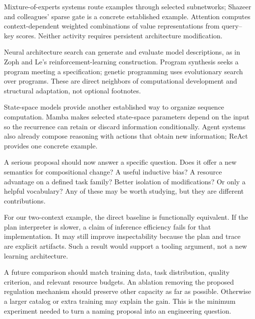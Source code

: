 Mixture-of-experts systems route examples through selected subnetworks; Shazeer and colleagues' sparse gate is a concrete established example.\cite{moe} Attention computes context-dependent weighted combinations of value representations from query--key scores.\cite{attention} Neither activity requires persistent architecture modification.

Neural architecture search can generate and evaluate model descriptions, as in Zoph and Le's reinforcement-learning construction.\cite{nas} Program synthesis seeks a program meeting a specification;\cite{synthesis} genetic programming uses evolutionary search over programs.\cite{gp} These are direct neighbors of computational development and structural adaptation, not optional footnotes.

State-space models provide another established way to organize sequence computation. Mamba makes selected state-space parameters depend on the input so the recurrence can retain or discard information conditionally.\cite{mamba} Agent systems also already compose reasoning with actions that obtain new information; ReAct provides one concrete example.\cite{react}

A serious proposal should now answer a specific question. Does it offer a new semantics for compositional change? A useful inductive bias? A resource advantage on a defined task family? Better isolation of modifications? Or only a helpful vocabulary? Any of these may be worth studying, but they are different contributions.

For our two-context example, the direct baseline is functionally equivalent. If the plan interpreter is slower, a claim of inference efficiency fails for that implementation. It may still improve inspectability because the plan and trace are explicit artifacts. Such a result would support a tooling argument, not a new learning architecture.

A future comparison should match training data, task distribution, quality criterion, and relevant resource budgets. An ablation removing the proposed regulation mechanism should preserve other capacity as far as possible. Otherwise a larger catalog or extra training may explain the gain. This is the minimum experiment needed to turn a naming proposal into an engineering question.

